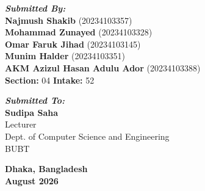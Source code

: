 \documentclass[12pt,journal,onecolumn,a4paper]{IEEEtran}
\begin{document}
\begin{titlepage}
\begin{center}
        \begin{minipage}{0.48\textwidth}
            \begin{flushleft} \large
                \textbf{\textit{Submitted By:}}\\[0.3cm]
                \textbf{Najmush Shakib} (20234103357)\\
                \textbf{Mohammad Zunayed} (20234103328)\\
                \textbf{Omar Faruk Jihad} (20234103145)\\
                \textbf{Munim Halder} (20234103351)\\
                \textbf{AKM Azizul Hasan Adulu Ador} (20234103388)\\[0.5cm]
                \textbf{Section:} 04 \hspace{0.5cm} \textbf{Intake:} 52
            \end{flushleft}
        \end{minipage}
        \hfill
        \begin{minipage}{0.48\textwidth}
            \begin{flushright} \large
                \textbf{\textit{Submitted To:}}\\[0.3cm]
                \textbf{Sudipa Saha}\\[0.1cm]
                Lecturer\\[0.1cm]
                Dept. of Computer Science and Engineering\\[0.1cm]
                BUBT
            \end{flushright}
        \end{minipage}
        
        \vfill
        
        {\large \textbf{Dhaka, Bangladesh}}\\[0.2cm]
        {\large \textbf{August 2026}}
        \vspace*{1cm}
    \end{center}
\end{titlepage}

\onehalfspacing
{}
\end{document}
